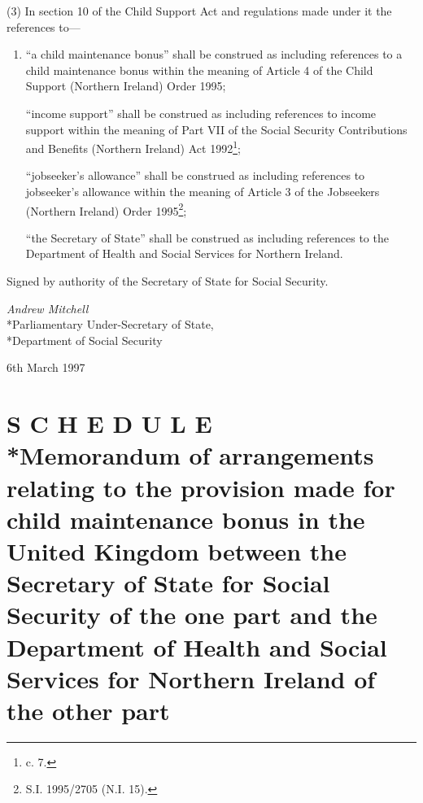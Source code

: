 \documentclass[12pt,a4paper]{article}
\begin{document}
(3) In section 10 of the Child Support Act and regulations made under it the references to—
\begin{enumerate}\item[]
“a child maintenance bonus” shall be construed as including references to a child maintenance bonus within the meaning of Article 4 of the Child Support (Northern Ireland) Order 1995;

“income support” shall be construed as including references to income support within the meaning of Part VII of the Social Security Contributions and Benefits (Northern Ireland) Act 1992\footnote{ c. 7.};

“jobseeker’s allowance” shall be construed as including references to jobseeker’s allowance within the meaning of Article 3 of the Jobseekers (Northern Ireland) Order 1995\footnote{\frenchspacing S.I. 1995/2705 (N.I. 15).};

“the Secretary of State” shall be construed as including references to the Department of Health and Social Services for Northern Ireland.
\end{enumerate}

\bigskip

Signed by authority of the Secretary of State for Social Security.

{\raggedleft
\emph{Andrew Mitchell}\\*Parliamentary Under-Secretary of State,\\*Department of Social Security

}

6th March 1997

\small

\part[Schedule --- Memorandum of arrangements relating to the provision made for child maintenance bonus in the United Kingdom between the Secretary of State for Social Security of the one part and the Department of Health and Social Services for Northern Ireland of the other part]{S C H E D U L E\\*Memorandum of arrangements relating to the provision made for child maintenance bonus in the United Kingdom between the Secretary of State for Social Security of the one part and the Department of Health and Social Services for Northern Ireland of the other part}

\renewcommand\parthead{--- Schedule}
\end{document}
